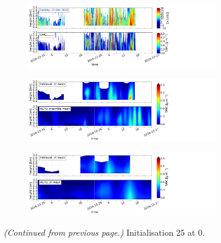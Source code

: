 \begin{figure}[H]\ContinuedFloat
	\centering
	\begin{subfigure}[t]{\textwidth}
		\centering
		\includegraphics[trim={0.cm 2.2cm 19.cm 0.5cm},clip,width=0.9\textwidth]{./fig_obs_ret/20161225}
		\caption{}\label{fig:SWC:ret_25}
	\end{subfigure}
	\begin{subfigure}[t]{\textwidth}
		\centering
		\includegraphics[trim={0.cm 2.2cm 19.cm 0.5cm},clip,width=0.9\textwidth]{./fig_vert_SWC_EM/20161225}
		\caption{}\label{fig:SWC_EM:25}
	\end{subfigure}
	\begin{subfigure}[t]{\textwidth}
		\centering
		\includegraphics[trim={0.cm 0.8cm 19.cm 0.5cm},clip,width=0.9\textwidth]{./fig_vert_SWC_3h/20161225}
		\caption{}\label{fig:SWC3h:25}
	\end{subfigure}
	\caption{\textit{(Continued from previous page.)} Initialisation \SI{25}{\dec} at \SI{0}{\UTC}.}
\end{figure}
